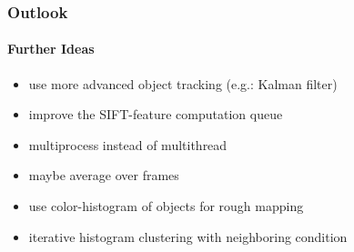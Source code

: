 \documentclass[]{beamer}
\begin{document}
\begin{frame}
    \frametitle{Outlook}
    \framesubtitle{Further Ideas}
    \begin{itemize}
        \item<+-> use more advanced object tracking (e.g.: Kalman filter)
        \item<+-> improve the SIFT-feature computation queue
        \item<+-> multiprocess instead of multithread
        \item<+-> maybe average over frames
        \item<+-> use color-histogram of objects for rough mapping
        \item<+-> iterative histogram clustering with neighboring condition
    \end{itemize}
\end{frame}

\end{document}
